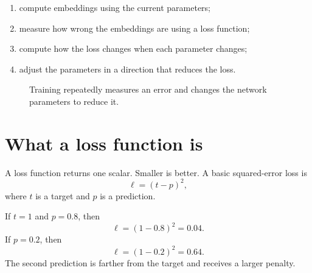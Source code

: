 \documentclass[11pt,oneside,openany]{book}
\theoremstyle{myplain}
\theoremstyle{definition}
\begin{document}
\begin{enumerate}[leftmargin=*,itemsep=5pt]
  \item compute embeddings using the current parameters;
  \item measure how wrong the embeddings are using a loss function;
  \item compute how the loss changes when each parameter changes;
  \item adjust the parameters in a direction that reduces the loss.
\end{enumerate}

\begin{figure}[H]
\centering
{}
\caption{Training repeatedly measures an error and changes the network parameters to reduce it.}
\end{figure}

\section{What a loss function is}

A loss function returns one scalar. Smaller is better. A basic squared-error loss is
\[
  \ell=(t-p)^2,
\]
where $t$ is a target and $p$ is a prediction.

If $t=1$ and $p=0.8$, then
\[
\ell=(1-0.8)^2=0.04.
\]
If $p=0.2$, then
\[
\ell=(1-0.2)^2=0.64.
\]
The second prediction is farther from the target and receives a larger penalty.
\end{document}
